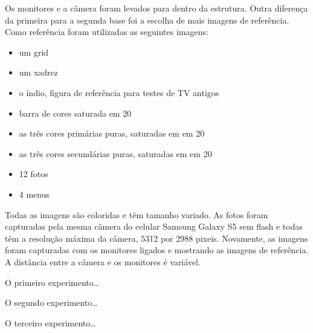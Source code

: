 Os monitores e a câmera foram levados para dentro da estrutura. Outra diferença da primeira para a segunda base foi a escolha de mais imagens de referência. Como referência foram utilizadas as seguintes imagens:
\begin{itemize}
\item um grid
\item um xadrez
\item o índio, figura de referência para testes de TV antigos
\item barra de cores saturada em 20%
\item as três cores primárias puras, saturadas em em 20%
\item as três cores secundárias puras, saturadas em em 20%
\item 12 fotos
\item 4 menus
\end{itemize}

Todas as imagens são coloridas e têm tamanho variado. As fotos foram capturadas pela mesma câmera do celular Samsung Galaxy S5 sem flash e todas têm a resolução máxima da câmera, 5312 por 2988 pixeis. Novamente, as imagens foram capturadas com os monitores ligados e mostrando as imagens de referência. A distância entre a câmera e os monitores é variável. 

O primeiro experimento…

O segundo experimento…

O terceiro experimento…
